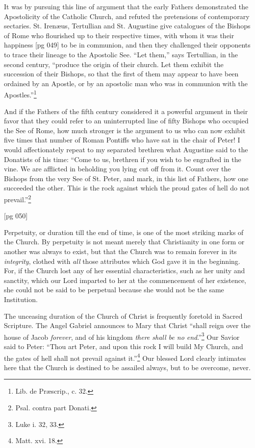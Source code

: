It was by pursuing this line of argument that
the early Fathers demonstrated the Apostolicity
of the Catholic Church, and refuted the pretensions
of contemporary sectaries. St. Irenæus,
Tertullian and St. Augustine give catalogues of
the Bishops of Rome who flourished up to their
respective times, with whom it was their happiness
[pg 049]
to be in communion, and then they challenged
their opponents to trace their lineage to the Apostolic
See. “Let them,” says Tertullian, in the
second century, “produce the origin of their
church. Let them exhibit the succession of their
Bishops, so that the first of them may appear to
have been ordained by an Apostle, or by an apostolic
man who was in communion with the Apostles.”\footnote{Lib.
de Præscrip., c. 32.}

And if the Fathers of the fifth century considered
it a powerful argument in their favor that
they could refer to an uninterrupted line of fifty
Bishops who occupied the See of Rome, how much
stronger is the argument to us who can now exhibit
five times that number of Roman Pontiffs
who have sat in the chair of Peter! I would affectionately
repeat to my separated brethren what
Augustine said to the Donatists of his time:
“Come to us, brethren if you wish to be engrafted
in the vine. We are afflicted in beholding you
lying cut off from it. Count over the Bishops
from the very See of St. Peter, and mark, in this
list of Fathers, how one succeeded the other.
This is the rock against which the proud gates of
hell do not prevail.”\footnote{Psal. contra part Donati.}

[pg 050]


Perpetuity, or duration till the end of
time, is one of the most striking marks of
the Church. By perpetuity is not meant
merely that Christianity in one form or another
was always to exist, but that the Church was to
remain forever in its \emph{integrity}, clothed with \emph{all}
those attributes which God gave it in the beginning.
For, if the Church lost any of her essential
characteristics, such as her unity and sanctity,
which our Lord imparted to her at the commencement
of her existence, she could not be said
to be perpetual because she would not be the same
Institution.

The unceasing duration of the Church of Christ
is frequently foretold in Sacred Scripture. The
Angel Gabriel announces to Mary that Christ
“shall reign over the house of Jacob \emph{forever},
and of his kingdom \emph{there shall be no end}.”\footnote{Luke
i. 32, 33.} Our
Savior said to Peter: “Thou art Peter, and upon
this rock I will build My Church, and the gates
of hell shall not prevail against it.”\footnote{Matt. xvi.
18.} Our blessed
Lord clearly intimates here that the Church is
destined to be assailed always, but to be overcome,
never.

